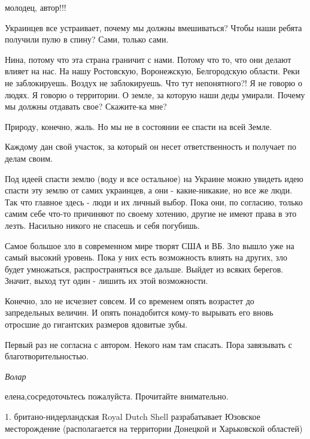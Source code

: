 \begin{itemize}

молодец, автор!!!


Украинцев все устраивает, почему мы должны вмешиваться? Чтобы наши ребята
получили пулю в спину? Сами, только сами.

\begin{itemize} %

Нина, потому что эта страна граничит с нами. Потому что то, что они делают
влияет на нас. На нашу Ростовскую, Воронежскую, Белгородскую области. Реки не
заблокируешь. Воздух не заблокируешь. Что тут непонятного?! Я не говорю о
людях. Я говорю о территории. О земле, за которую наши деды умирали. Почему мы
должны отдавать свое? Скажите-ка мне?
\end{itemize} %


Природу, конечно, жаль. Но мы не в состоянии ее спасти на всей Земле.

Каждому дан свой участок, за который он несет ответственность и получает по
делам своим.

Под идеей спасти землю (воду и все остальное) на Украине можно увидеть идею
спасти эту землю от самих украинцев, а они - какие-никакие, но все же люди. Так
что главное здесь - люди и их личный выбор. Пока они, по согласию, только самим
себе что-то причиняют по своему хотению, другие не имеют права в это лезть.
Насильно никого не спасешь и себя погубишь.

Самое большое зло в современном мире творят США и ВБ. Зло вышло уже на самый
высокий уровень. Пока у них есть возможность влиять на других, зло будет
умножаться, распространяться все дальше. Выйдет из всяких берегов. Значит,
выход тут один - лишить их этой возможности.

Конечно, зло не исчезнет совсем. И со временем опять возрастет до запредельных
величин. И опять понадобится кому-то вырывать его вновь отросшие до гигантских
размеров ядовитые зубы.


Первый раз не согласна с автором. Некого нам там спасать. Пора завязывать с
благотворительностью.

\begin{itemize} %
\emph{Волар}

елена,сосредоточьтесь пожалуйста. Прочитайте внимательно.

1. британо-нидерландская Royal Dutch Shell разрабатывает Юзовское месторождение
(располагается на территории Донецкой и Харьковской областей)


\end{itemize}
\end{itemize}
